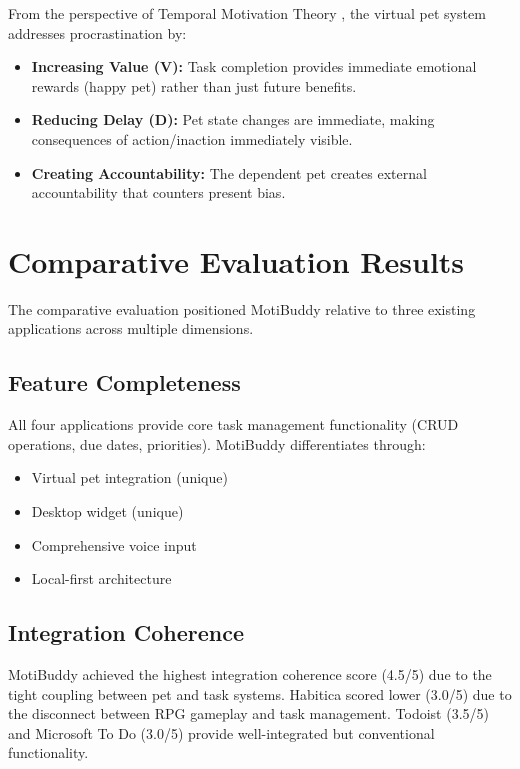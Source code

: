 From the perspective of Temporal Motivation Theory \citep{steel2007nature}, the virtual pet system addresses procrastination by:

\begin{itemize}
    \item \textbf{Increasing Value (V):} Task completion provides immediate emotional rewards (happy pet) rather than just future benefits.
    
    \item \textbf{Reducing Delay (D):} Pet state changes are immediate, making consequences of action/inaction immediately visible.
    
    \item \textbf{Creating Accountability:} The dependent pet creates external accountability that counters present bias.
\end{itemize}

\section{Comparative Evaluation Results}
\label{sec:comparative-results}

\completed

The comparative evaluation positioned MotiBuddy relative to three existing applications across multiple dimensions.

\subsection{Feature Completeness}

All four applications provide core task management functionality (CRUD operations, due dates, priorities). MotiBuddy differentiates through:

\begin{itemize}
    \item Virtual pet integration (unique)
    \item Desktop widget (unique)
    \item Comprehensive voice input
    \item Local-first architecture
\end{itemize}

\subsection{Integration Coherence}

MotiBuddy achieved the highest integration coherence score (4.5/5) due to the tight coupling between pet and task systems. Habitica scored lower (3.0/5) due to the disconnect between RPG gameplay and task management. Todoist (3.5/5) and Microsoft To Do (3.0/5) provide well-integrated but conventional functionality.

